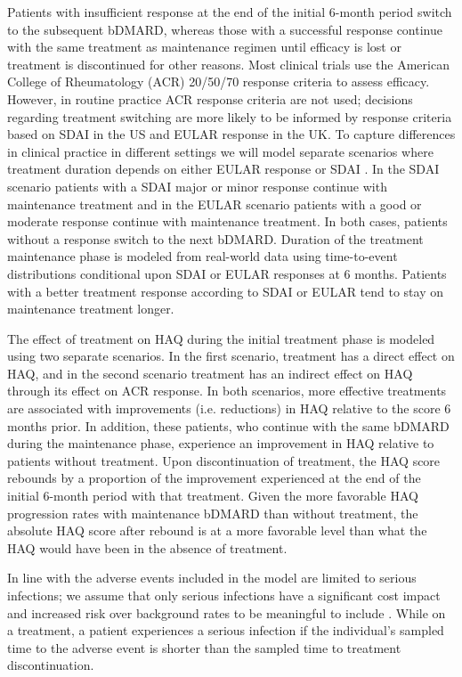 \documentclass[11pt,final,fleqn]{article}\usepackage[]{graphicx}\usepackage[]{color}
\theoremstyle{plain}
\begin{document}
Patients with insufficient response at the end of the initial 6-month
period switch to the subsequent bDMARD, whereas those with a successful
response continue with the same treatment as maintenance regimen until
efficacy is lost or treatment is discontinued for other reasons. Most
clinical trials use the American College of Rheumatology (ACR) 20/50/70
response criteria to assess efficacy. However, in routine practice ACR
response criteria are not used; decisions regarding treatment switching
are more likely to be informed by response criteria based on SDAI in the
US and EULAR response in the UK. To capture differences in clinical
practice in different settings we will model separate scenarios where
treatment duration depends on either EULAR response or
SDAI \citep{tosh2011sheffield, madan2015consensus}. In the SDAI scenario
patients with a SDAI major or minor response continue with maintenance
treatment and in the EULAR scenario patients with a good or moderate
response continue with maintenance treatment. In both cases, patients
without a response switch to the next bDMARD. Duration of the treatment
maintenance phase is modeled from real-world data using time-to-event
distributions conditional upon SDAI or EULAR responses at 6 months.
Patients with a better treatment response according to SDAI or EULAR
tend to stay on maintenance treatment longer.

The effect of treatment on HAQ during the initial treatment phase is
modeled using two separate scenarios. In the first scenario, treatment
has a direct effect on HAQ, and in the second scenario treatment has an
indirect effect on HAQ through its effect on ACR response. In both
scenarios, more effective treatments are associated with improvements
(i.e. reductions) in HAQ relative to the score 6 months prior. In
addition, these patients, who continue with the same bDMARD during the
maintenance phase, experience an improvement in HAQ relative to patients
without treatment. Upon discontinuation of treatment, the HAQ score
rebounds by a proportion of the improvement experienced at the end of
the initial 6-month period with that treatment. Given the more favorable
HAQ progression rates with maintenance bDMARD than without treatment,
the absolute HAQ score after rebound is at a more favorable level than
what the HAQ would have been in the absence of treatment.

In line with \citet{stevenson2016adalimumab} the adverse
events included in the model are limited to serious infections; we
assume that only serious infections have a significant cost impact and
increased risk over background rates to be meaningful to
include \citep{ramiro2017safety}. While on a
treatment, a patient experiences a serious infection if the individual's
sampled time to the adverse event is shorter than the sampled time to
treatment discontinuation.
\end{document}
